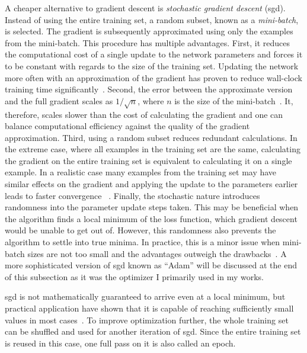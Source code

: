 A cheaper alternative to gradient descent is \emph{stochastic gradient descent} (\acrshort{sgd}). Instead of using the entire training set, a random subset, known as a \emph{mini-batch}, is selected. The gradient is subsequently approximated using only the examples from the mini-batch. This procedure has multiple advantages. First, it reduces the computational cost of a single update to the network parameters and forces it to be constant with regards to the size of the training set. Updating the network more often with an approximation of the gradient has proven to reduce wall-clock training time significantly~\cite{Goodfellow:2016:DNN}. %
Second, the error between the approximate version and the full gradient scales as $1/\sqrt{n}$, where $n$ is the size of the mini-batch~\cite{Goodfellow:2016:DNN}. %
It, therefore, scales slower than the cost of calculating the gradient and one can balance computational efficiency against the quality of the gradient approximation. Third, using a random subset reduces redundant calculations. In the extreme case, where all examples in the training set are the same, calculating the gradient on the entire training set is equivalent to calculating it on a single example. In a realistic case many examples from the training set may have similar effects on the gradient and applying the update to the parameters earlier leads to faster convergence ~\cite{Goodfellow:2016:DNN}. %
Finally, the stochastic nature introduces randomness into the parameter update steps taken. This may be beneficial when the algorithm finds a local minimum of the loss function, which gradient descent would be unable to get out of. However, this randomness also prevents the algorithm to settle into true minima. In practice, this is a minor issue when mini-batch sizes are not too small and the advantages outweigh the drawbacks~\cite{Geron:2017aaa}. %
A more sophisticated version of \acrshort{sgd} known as ``Adam'' will be discussed at the end of this subsection as it was the optimizer I primarily used in my works.

\acrshort{sgd} is not mathematically guaranteed to arrive even at a local minimum, but practical application have shown that it is capable of reaching sufficiently small values in most cases~\cite{Goodfellow:2016:DNN}. %
To improve optimization further, the whole training set can be shuffled and used for another iteration of \acrshort{sgd}. Since the entire training set is reused in this case, one full pass on it is also called an epoch.

